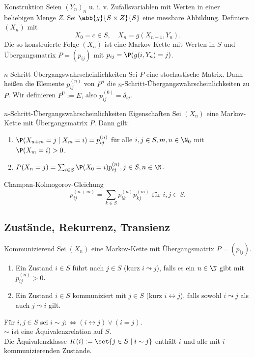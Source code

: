 \begin{karte}{Konstruktion}
    Seien \((Y_n)_n\) u. i. v. Zufallsvariablen mit Werten in einer beliebigen Menge \(Z\).
    Sei \(\abb{g}{S\times Z}{S}\) eine messbare Abbildung. 
    Definiere \( (X_n) \) mit 
    \[ X_0 = c \in S, \quad X_n = g(X_{n-1}, Y_n). \]
    Die so konstruierte Folge \((X_n)\) ist eine Markov-Kette mit Werten 
    in \(S\) und Übergangsmatrix \(P = (p_{ij})\) 
    mit \(p_{ij} = \P(g(i,Y_n) = j)\).
\end{karte}

\begin{karte}{\(n\)-Schritt-Übergangswahrscheinlichkeiten}
    Sei \(P\) eine stochastische Matrix. Dann heißen die Elemente 
    \(p_{ij}^{(n)}\) von \(P^n\) die \(n\)-Schritt-Übergangswahrscheinlichkeiten zu \(P\).
    Wir definieren \(P^0 := E\), also \(p_{ij}^{(0)} = \delta_{ij}\).
\end{karte}

\begin{karte}{\(n\)-Schritt-Übergangswahrscheinlichkeiten Eigenschaften}
    Sei \((X_n)\) eine Markov-Kette mit Übergangsmatrix \(P\). Dann gilt: 
    \begin{enumerate}
        \item \( \P(X_{n+m} = j \;|\; X_m = i) = p_{ij}^{(n)} \) für alle \(i,j\in S, m,n\in \N_0\) mit \(\P(X_m = i)>0\).
        \item \(P(X_n = j) = \sum_{i\in S} \P(X_0 = i) p_{ij}^{(n)}, j\in S, n\in \N\).
    \end{enumerate}
\end{karte}

\begin{karte}{Champan-Kolmogorov-Gleichung}
    \[ p_{ij}^{(n+m)} = \sum_{k\in S} p_{ik}^{(n)} p_{kj}^{(m)} \text{ für } i,j\in S. \]
\end{karte}

\subsection*{Zustände, Rekurrenz, Transienz}

\begin{karte}{Kommunizierend}
    Sei \((X_n)\) eine Markov-Kette mit Übergangsmatrix \(P = (p_{ij})\). 
    \begin{enumerate}
        \item Ein Zustand \(i\in S\) führt nach \(j\in S\) (kurz \(i \leadsto j\)), falls es ein \(n\in\N\) gibt mit \(p_{ij}^{(n)} > 0\).
        \item Ein Zustand \(i\in S\) kommuniziert mit \(j\in S\) (kurz \(i \leftrightarrow j\)), falls sowohl \(i \leadsto j\) als auch \(j \leadsto i\) gilt.
    \end{enumerate}

    Für \(i,j \in S\) sei \(i \sim j :\Leftrightarrow (i\leftrightarrow j) \vee (i = j)\). \\
    \(\sim \) ist eine Äquivalenzrelation auf \(S\).\\
    Die Äquivalenzklasse \(K(i) := \set{j\in S \;|\; i \sim j}\) enthält \(i\) und alle 
    mit \(i\) kommunizierenden Zustände.
\end{karte}

